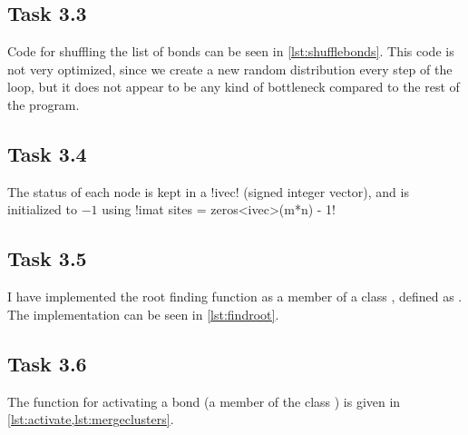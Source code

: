 \documentclass[a4paper]{article}
\newcommand{\cpp}{\texttt{C++}}
\begin{document}
\subsection*{Task 3.3}
Code for shuffling the list of bonds can be seen in \cref{lst:shufflebonds}. This code is not very optimized, since we create a new random distribution every step of the loop, but it does not appear to be any kind of bottleneck compared to the rest of the program.
\begin{listing}[h!]
%
\caption{%
    A \cpp\ code snippet for shuffling the columns in a Armadillo matrix, utilizing the  function from Armadillo. Bonds are stored in a $(2, M)$ matrix.%
    \label{lst:shufflebonds}%
}
\end{listing}
\FloatBarrier

\subsection*{Task 3.4}
The status of each node is kept in a \cppinline!ivec! (signed integer vector), and is initialized to $-1$ using
\cppmint!imat sites = zeros<ivec>(m*n) - 1!

\subsection*{Task 3.5}
I have implemented the root finding function as a member of a class , defined as . The implementation can be seen in \cref{lst:findroot}.
\begin{listing}[h!]
%
\caption{%
    Member function of the class  that finds the root node of a site .  is a member variable of  with type .%
    \label{lst:findroot}%
}
\end{listing}
\FloatBarrier

\subsection*{Task 3.6}
The function for activating a bond (a member of the class ) is given in \cref{lst:activate,lst:mergeclusters}.
\begin{listing}[h!]
%
\caption{%
    Member function of the class  that activates a bond . See \cref{lst:mergeclusters} for the implementation of the function .%
    \label{lst:activate}%
}
\end{listing}
\end{document}
